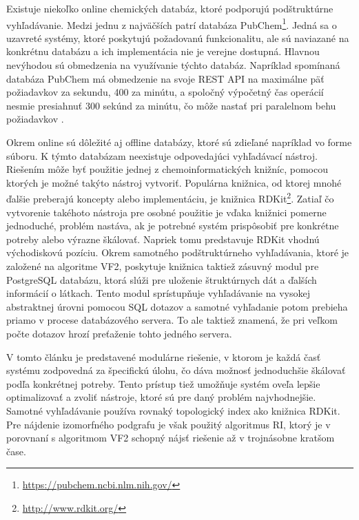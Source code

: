 \documentclass[slovak]{ExcelAtFIT} %
\begin{document}
Existuje niekoľko online chemických databáz, ktoré podporujú podštruktúrne vyhľadávanie. Medzi jednu z najväčších patrí databáza PubChem\footnote{\url{https://pubchem.ncbi.nlm.nih.gov/}}. Jedná sa o uzavreté systémy, ktoré poskytujú požadovanú funkcionalitu, ale sú naviazané na konkrétnu databázu a ich implementácia nie je verejne dostupná. Hlavnou nevýhodou sú obmedzenia na využívanie týchto databáz. Napríklad spomínaná databáza PubChem má obmedzenie na svoje REST API na maximálne päť požiadavkov za sekundu, 400 za minútu, a spoločný výpočetný čas operácií nesmie presiahnuť 300 sekúnd za minútu, čo môže nastať pri paralelnom behu po\-žia\-dav\-kov \cite{pubchem_limits}. 

Okrem online sú dôležité aj offline databázy, ktoré sú zdieľané napríklad vo forme súboru. K týmto databázam neexistuje odpovedajúci vyhľadávací nástroj. Riešením môže byť použitie jednej z chemoinformatických knižníc, pomocou ktorých je možné takýto nástroj vytvoriť. Populárna knižnica, od ktorej mnohé ďalšie preberajú koncepty alebo implementáciu, je knižnica RDKit\footnote{\url{http://www.rdkit.org/}}. Zatiaľ čo vytvorenie takéhoto ná\-stro\-ja pre osobné použitie je vďaka knižnici pomerne jednoduché, problém nastáva, ak je potrebné systém pri\-spô\-so\-biť pre konkrétne potreby alebo výrazne škálovať. Napriek tomu predstavuje RDKit vhodnú východiskovú pozíciu. Okrem samotného podštruktúrneho vy\-hľa\-dá\-va\-nia, ktoré je založené na algoritme VF2, poskytuje knižnica taktiež zásuvný modul pre PostgreSQL databázu, ktorá slúži pre uloženie štruktúrnych dát a ďalších informácií o látkach. Tento modul sprístupňuje vyhľadávanie na vysokej abstraktnej úrovni pomocou SQL dotazov a samotné vyhľadanie potom prebieha priamo v procese databázového servera. To ale taktiež znamená, že pri veľkom počte dotazov hrozí preťaženie tohto jedného servera.

V tomto článku je predstavené modulárne riešenie, v ktorom je každá časť systému zodpovedná za špe\-ci\-fi\-ckú úlohu, čo dáva možnosť jednoduchšie škálovať podľa konkrétnej potreby. Tento prístup tiež umožňuje systém oveľa lepšie optimalizovať a zvoliť nástroje, ktoré sú pre daný problém najvhodnejšie. Samotné vyhľadávanie používa rovnaký topologický index ako knižnica RDKit. Pre nájdenie izomorfného podgrafu je však použitý algoritmus RI, ktorý je v porovnaní s algoritmom VF2 schopný nájsť riešenie až v trojnásobne kratšom čase. 
\end{document}
